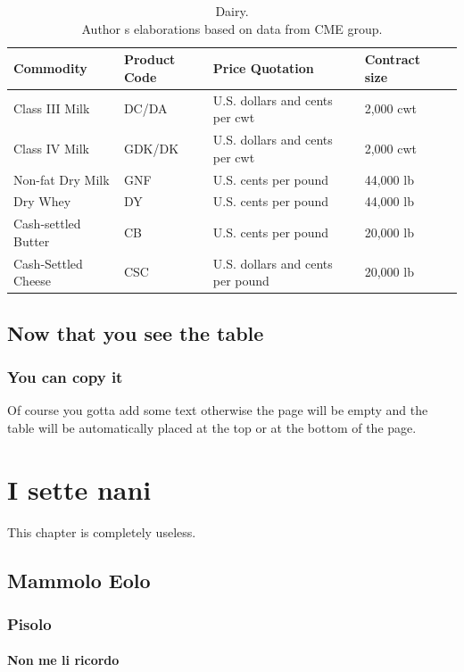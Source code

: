 \documentclass{article}
\begin{document}
\begin{table}
\centering
\scriptsize %
    \begin{tabular}{@{}lllll@{}}
\hline
Commodity & Product Code & Price Quotation & Contract size &  \\ \hline
Class III Milk & DC/DA & U.S. dollars and cents per cwt & 2,000 cwt &  \\
Class IV Milk & GDK/DK & U.S. dollars and cents per cwt & 2,000 cwt & \\
Non-fat Dry Milk & GNF & U.S. cents per pound & 44,000 lb &  \\ 
Dry Whey & DY & U.S. cents per pound & 44,000 lb & \\
Cash-settled Butter & CB & U.S. cents per pound & 20,000 lb & \\
Cash-Settled Cheese & CSC & U.S. dollars and cents per pound & 20,000 lb & \\ 
\hline
\end{tabular}
\caption {Dairy. \\
Author s elaborations based on data from CME group.}
\label{tab:table3}
\end{table}

\section{Now that you see the table}
\subsection{You can copy it}
Of course you gotta add some text otherwise the page will be empty and the table will be automatically placed at the top or at the bottom of the page.

\chapter{I sette nani}

This chapter is completely useless.
\section{Mammolo Eolo}
\subsection{Pisolo}
\subsubsection{Non me li ricordo}
\end{document}
